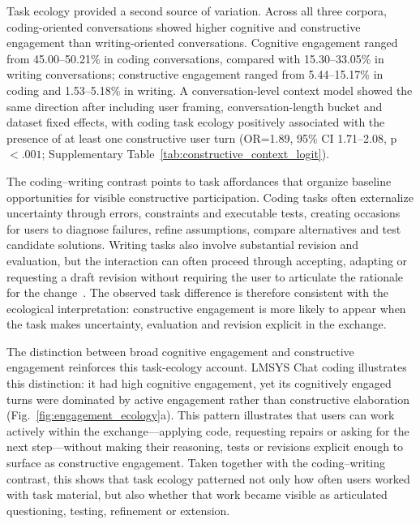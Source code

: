 Task ecology provided a second source of variation. Across all three corpora, coding-oriented conversations showed higher cognitive and constructive engagement than writing-oriented conversations. Cognitive engagement ranged from 45.00--50.21\% in coding conversations, compared with 15.30--33.05\% in writing conversations; constructive engagement ranged from 5.44--15.17\% in coding and 1.53--5.18\% in writing. A conversation-level context model showed the same direction after including user framing, conversation-length bucket and dataset fixed effects, with coding task ecology positively associated with the presence of at least one constructive user turn (OR=1.89, 95\% CI 1.71--2.08, p$<.001$; Supplementary Table~\ref{tab:constructive_context_logit}).

The coding--writing contrast points to task affordances that organize baseline opportunities for visible constructive participation. Coding tasks often externalize uncertainty through errors, constraints and executable tests, creating occasions for users to diagnose failures, refine assumptions, compare alternatives and test candidate solutions. Writing tasks also involve substantial revision and evaluation, but the interaction can often proceed through accepting, adapting or requesting a draft revision without requiring the user to articulate the rationale for the change~\cite{keuning2018systematic,flower1981cognitive,sommers1980revision}. The observed task difference is therefore consistent with the ecological interpretation: constructive engagement is more likely to appear when the task makes uncertainty, evaluation and revision explicit in the exchange.

The distinction between broad cognitive engagement and constructive engagement reinforces this task-ecology account. LMSYS Chat coding illustrates this distinction: it had high cognitive engagement, yet its cognitively engaged turns were dominated by active engagement rather than constructive elaboration (Fig.~\ref{fig:engagement_ecology}a). This pattern illustrates that users can work actively within the exchange---applying code, requesting repairs or asking for the next step---without making their reasoning, tests or revisions explicit enough to surface as constructive engagement. Taken together with the coding--writing contrast, this shows that task ecology patterned not only how often users worked with task material, but also whether that work became visible as articulated questioning, testing, refinement or extension.




